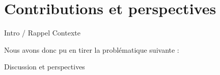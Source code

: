 \label{conclusion}
\section{Contributions et perspectives}
Intro / Rappel Contexte

Nous avons donc pu en tirer la problématique suivante :


Discussion et perspectives
